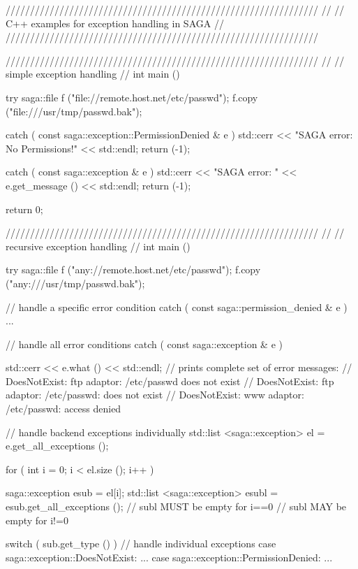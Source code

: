  \begin{mycode}
  ////////////////////////////////////////////////////////////////
  // 
  // C++ examples for exception handling in SAGA
  // 
  ////////////////////////////////////////////////////////////////
 
  ////////////////////////////////////////////////////////////////
  // 
  // simple exception handling
  //
  int main ()
  {
    try
    {
      saga::file f ("file://remote.host.net/etc/passwd");
      f.copy ("file:///usr/tmp/passwd.bak");
    }
 
    catch ( const saga::exception::PermissionDenied & e )
    {
      std::cerr << "SAGA error: No Permissions!" << std::endl;
      return (-1);
    }
 
    catch ( const saga::exception & e )
    {
      std::cerr << "SAGA error: " 
                << e.get_message () 
                << std::endl;
      return (-1);
    }
 
    return 0;
  }

 
  ////////////////////////////////////////////////////////////////
  // 
  // recursive exception handling
  //
  int main ()
  {
    try 
    {
      saga::file f ("any://remote.host.net/etc/passwd");
      f.copy ("any:///usr/tmp/passwd.bak");
    }

    // handle a specific error condition
    catch ( const saga::permission_denied & e )
    {
      ...
    }

    // handle all error conditions
    catch ( const saga::exception & e )
    {
       std::cerr << e.what () << std::endl;
       // prints complete set of error messages:
       // DoesNotExist: ftp adaptor: /etc/passwd does not exist
       //   DoesNotExist: ftp adaptor: /etc/passwd: does not exist
       //   DoesNotExist: www adaptor: /etc/passwd: access denied

       // handle backend exceptions individually
       std::list <saga::exception> el = e.get_all_exceptions ();

       for ( int i = 0; i < el.size (); i++ )
       {
         saga::exception esub = el[i];
         std::list <saga::exception> esubl = esub.get_all_exceptions ();
         // subl MUST be empty for i==0
         // subl MAY  be empty for i!=0 

         switch ( sub.get_type () )
         {
           // handle individual exceptions
           case saga::exception::DoesNotExist:
             ...
           case saga::exception::PermissionDenied:
             ...
         }
       }


}}
\end{mycode}
